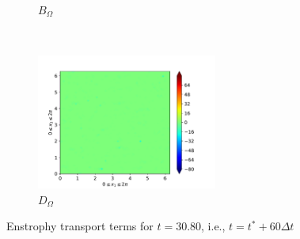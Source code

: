 \begin{figure}[H]
\begin{subfigure}{0.45\textwidth}
        \caption{$B_{\Omega}$}
    \end{subfigure}
    ~
    \begin{subfigure}{0.45\textwidth}
        \includegraphics[height=1.75in]{media/run-cds-65/D-enst-1400}
        \caption{$D_{\Omega}$}
    \end{subfigure}
    \caption{Enstrophy transport terms for $t=30.80$, i.e., $t=t^{\ast} + 60 \Delta t$}
\end{figure}

\newpage

